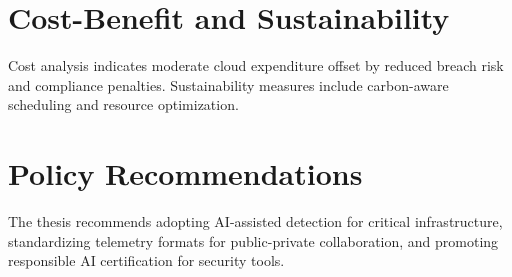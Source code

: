 \section{Cost-Benefit and Sustainability}
Cost analysis indicates moderate cloud expenditure offset by reduced breach risk and compliance penalties. Sustainability measures include carbon-aware scheduling and resource optimization.

\section{Policy Recommendations}
The thesis recommends adopting AI-assisted detection for critical infrastructure, standardizing telemetry formats for public-private collaboration, and promoting responsible AI certification for security tools.
